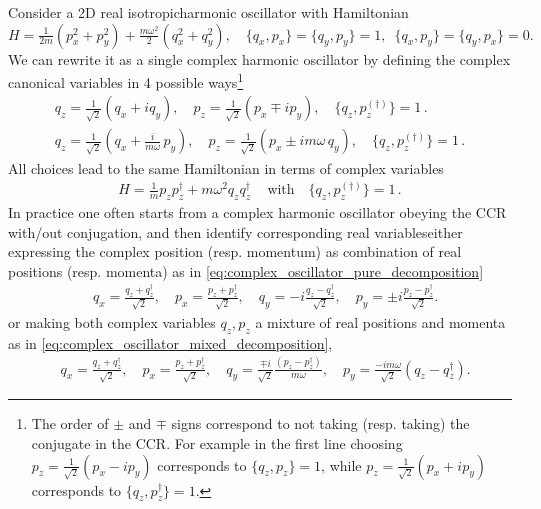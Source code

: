 \documentclass[../QFT_main.tex]{subfiles}
\begin{document}
\begin{mytheorem}
%
Consider a 2D real isotropic harmonic oscillator with Hamiltonian
\begin{equation}
    H = \tfrac{1}{2m}(p_x^2 + p_y^2) + \tfrac{m\omega^2}{2} (q_x^2 + q_y^2), \quad \{q_x, p_x\} = \{q_y, p_y\} = 1, \,\,\, \{q_x, p_y\} = \{q_y, p_x\} = 0.
\end{equation}
%
We can rewrite it as a single complex harmonic oscillator by defining the complex canonical variables in 4 possible ways\footnote{\label{fn:order_sign_CCR_conjugate} The order of $\pm$ and $\mp$ signs correspond to not taking (resp. taking) the conjugate in the CCR. For example in the first line choosing $p_z = \frac{1}{\sqrt{2}}(p_x - i p_y)$ corresponds to $\{q_z, p_z\} = 1$, while $p_z = \frac{1}{\sqrt{2}}(p_x + i p_y)$ corresponds to $\{q_z, p_z^\dagger\} = 1$.}
\begin{align}
    q_z = \frac{1}{\sqrt{2}}(q_x + i q_y), \quad p_z = \frac{1}{\sqrt{2}}(p_x \mp i p_y), \quad \{q_z, p_z^{(\dagger)}\} = 1\,. \label{eq:complex_oscillator_pure_decomposition}
    \\[4pt]
    q_z = \frac{1}{\sqrt{2}}(q_x + \tfrac{i}{{m\omega}}\, p_y), \quad p_z = \frac{1}{\sqrt{2}}(p_x \pm i {m\omega}\,q_y), \quad \{q_z, p_z^{(\dagger)}\} = 1\,. \label{eq:complex_oscillator_mixed_decomposition}
\end{align}
All choices lead to the same Hamiltonian in terms of complex variables
\begin{align}\label{eq:complex_harmonic_oscillator}
    H = \tfrac{1}{m} p_z p_z^{\dagger} + m \omega^2 q_z q_z^{\dagger}\,\quad \text{with}\quad \{q_z, p_z^{(\dagger)}\} = 1\,.
\end{align}
In practice one often starts from a complex harmonic oscillator obeying the CCR with/out conjugation, and then identify corresponding real variables either expressing the complex position (resp. momentum) as combination of real positions (resp. momenta) as in \eqref{eq:complex_oscillator_pure_decomposition}
\begin{align}
    &q_x=\frac{q_z+q_z^\dagger}{\sqrt{2}},\quad p_x =\frac{p_z+p_z^\dagger}{\sqrt{2}},\quad
    q_y=-i\frac{q_z - q_z^\dagger}{\sqrt{2}},\quad p_y =\pm i \frac{p_z - p_z^\dagger}{\sqrt{2}}.
\end{align}
or making both complex variables $q_z,p_z$ a mixture of real positions and momenta as in \eqref{eq:complex_oscillator_mixed_decomposition}, 
\begin{align}
    &q_x=\frac{q_z+q_z^\dagger}{\sqrt{2}},\quad p_x =\frac{p_z+p_z^\dagger}{\sqrt{2}},\quad
    q_y=\frac{\mp i}{\sqrt{2}}\frac{(p_z-p_z^\dagger)}{m\omega},\quad p_y =\frac{-im\omega}{\sqrt{2}} (q_z - q_z^\dagger).
\end{align}
%


\end{mytheorem}
\end{document}
